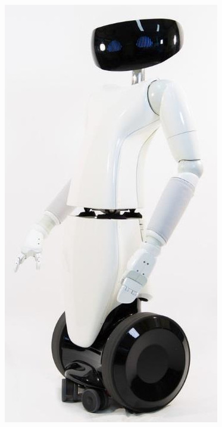 \documentclass[11pt,a4paper]{report}
\begin{document}
\begin{figure}
    \centering
    \includegraphics[width=\linewidth]{R1-profile}
    \label{fig|R1}
\end{figure}
\end{document}
